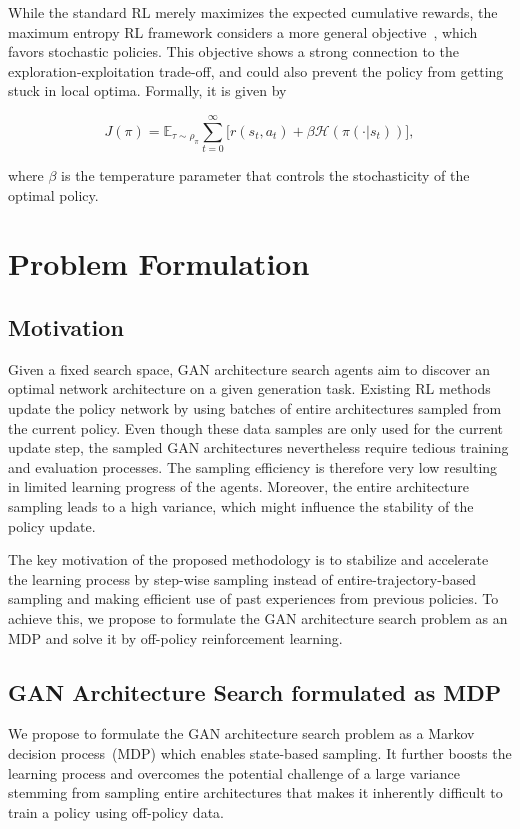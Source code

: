 \documentclass[runningheads]{llncs}
\begin{document}
While the standard RL merely maximizes the expected cumulative rewards, the maximum entropy RL framework  considers a more general objective~\cite{ziebart2010modeling}, which favors stochastic policies. This objective shows a strong connection to the exploration-exploitation trade-off, and could also prevent the policy from getting stuck in local optima. Formally, it is given by

\begin{equation}
    J(\pi) = \mathbb{E}_{\tau \sim \rho_{\pi}}{\sum_{t=0}^{\infty} [r(s_t, a_t)}+\beta\mathcal{H}(\pi(\cdot|s_t))], 
\label{eq:merl}
\end{equation}

\noindent where $\beta$ is the temperature parameter that controls the stochasticity of the optimal policy.



\section{Problem Formulation}

\subsection{Motivation}
Given a fixed search space, GAN architecture search agents aim to discover an optimal network architecture on a given generation task. Existing RL methods update the policy network by using batches of entire architectures sampled from the current policy. Even though these data samples are only used for the current update step, the sampled GAN architectures nevertheless require  tedious training and evaluation processes. The sampling efficiency is therefore very low resulting in limited learning progress of the agents. Moreover, the entire architecture sampling leads to a high variance, which might influence the stability of the policy update.


The key motivation of the proposed methodology is to stabilize and accelerate the learning process by step-wise sampling instead of entire-trajectory-based sampling and making efficient use of past experiences from previous policies. To achieve this, we propose to formulate the GAN architecture search problem as an MDP and solve it by off-policy reinforcement learning. 

\subsection{GAN Architecture Search formulated as MDP}
We propose to formulate the GAN architecture search problem as a  Markov decision process~(MDP) which enables state-based sampling. It further boosts the learning process and overcomes the potential challenge of a large variance stemming from sampling entire architectures  that makes it inherently difficult to train a policy using off-policy data. 
\end{document}
